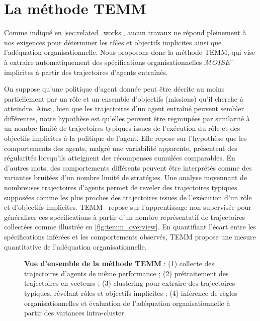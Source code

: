 \documentclass[francais,ROIA,Unicode,manuscript]{cedram}
\begin{document}
\section{La méthode TEMM}
\label{sec:TEMM_algorithm}

Comme indiqué en \autoref{sec:related_works}, aucun travaux ne répond pleinement à nos exigences pour déterminer les rôles et objectifs implicites ainsi que l'adéquation organisationnelle. Nous proposons donc la méthode TEMM, qui vise à extraire automatiquement des spécifications organisationnelles \(\mathcal{M}OISE^+\) implicites à partir des trajectoires d’agents entraînés.

On suppose qu'une politique d'agent donnée peut être décrite au moins partiellement par un rôle et un ensemble d'objectifs (missions) qu'il cherche à atteindre. Ainsi, bien que les trajectoires d'un agent entraîné peuvent sembler différentes, notre hypothèse est qu'elles peuvent être regroupées par similarité à un nombre limité de trajectoires typiques issues de l’exécution du rôle et des objectifs implicites à la politique de l'agent. Elle repose sur l’hypothèse que les comportements des agents, malgré une variabilité apparente, présentent des régularités lorsqu'ils atteignent des récompenses cumulées comparables. En d'autres mots, des comportements différents peuvent être interprétés comme des variantes bruitées d'un nombre limité de stratégies. Une analyse moyennant de nombreuses trajectoires d'agents permet de reveler des trajectoires typiques supposées comme les plus proches des trajectoires issues de l'exécution d'un rôle et d'objectifs implicites.
%
TEMM~\hyperref[fn:github]{\footnotemark[2]} repose sur l’apprentissage non supervisée pour généraliser ces spécifications à partir d'un nombre représentatif de trajectoires collectées comme illustrée en \autoref{fig:temm_overview}. En quantifiant l’écart entre les spécifications inférées et les comportements observés, TEMM propose une mesure quantitative de l'adéquation organisationnelle.

\begin{figure}[h!]
    \centering
    \resizebox{\textwidth}{!}{%
        
    }
    \caption{\textbf{Vue d'ensemble de la méthode TEMM} : (1) collecte des trajectoires d'agents de même performance ; (2) prétraitement des trajectoires en vecteurs ; (3) clustering pour extraire des trajectoires typiques, révélant rôles et objectifs implicites ; (4) inférence de règles organisationnelles et évaluation de l'adéquation organisationnelle à partir des variances intra-cluster.}
    \label{fig:temm_overview}
\end{figure}
\end{document}
